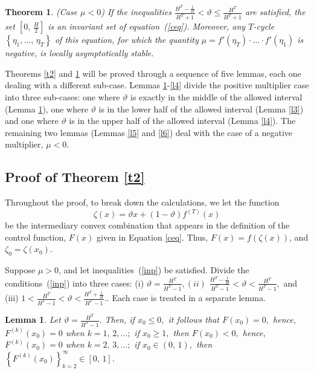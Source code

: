 \documentclass[12pt,a4paper]{amsart}
\newtheorem{theorem}{Theorem}
\newtheorem{lemma}{Lemma}
\begin{document}
\begin{theorem}\label{t3} ({\it Case $\mu < 0$})
If the inequalities $\frac{H^T-\frac{1}{H}}{H^T+1}<\vartheta\leq\frac{H^T}{H^T+1}$ are satisfied, the set $\left[0,\,\frac{H}{2}\right]$ is an invariant set
of equation~(\ref{ceq}). Moreover, any $T$-cycle $\left\{\eta_1,\ldots,\,\eta_T\right\}$ of this equation, for which the quantity 
$\mu = f'(\eta_T)\cdot\ldots\cdot f'(\eta_1)$ is negative, is locally asymptotically stable.
\end{theorem}
Theorems \ref{t2} and \ref{t3} will be proved through a sequence of five lemmas, each one dealing with a different sub-case.  Lemmas \ref{l2}-\ref{l4} divide the positive multiplier case into three sub-cases: one where $\vartheta$ is exactly in the middle of the allowed interval (Lemma \ref{l2}), one where $\vartheta$ is in the lower half of the allowed interval (Lemma \ref{l3}) and one where $\vartheta$ is in the upper half of the allowed interval (Lemma \ref{l4}).  The remaining two lemmas (Lemmas \ref{l5} and \ref{l6}) deal with the case of a negative multiplier, $\mu < 0$.


\subsection{Proof of Theorem \ref{t2}}
Throughout the proof, to break down the calculations, we let the function
$$ \zeta(x) = \vartheta x + (1 - \vartheta)f^{(T)} (x) $$
be the intermediary convex combination that appears in the definition of the control function, $F(x)$ given in Equation \eqref{ceq}. Thus, $F(x) = f(\zeta(x))$, and $\zeta_0 = \zeta(x_0)$.

Suppose $\mu > 0$, and let inequalities~(\ref{inp}) be satisfied. Divide the conditions~(\ref{inp}) into three cases: (i) $\vartheta=\frac{H^T}{H^T-1},(ii) $
$\frac{H^T-\frac{1}{H}}{H^T-1}<\vartheta<\frac{H^T}{H^T-1},$ and (iii) $1<\frac{H^T}{H^T-1}<\vartheta<\frac{H^T+\frac{1}{H}}{H^T-1}.$. Each case is treated in a separate lemma.

\begin{lemma}\label{l2}
Let $\vartheta=\frac{H^T}{H^T-1}.$ Then, if $x_0\leq 0,$ it follows that $F(x_0)=0,$ hence, $F^{(k)}(x_0)=0$ when $k=1,\,2,\ldots;$
if $x_0\geq 1,$ then $F(x_0)<0,$ hence, $F^{(k)}(x_0)=0$ when $k=2,\,3,\ldots;$ if $x_0\in(0,\,1),$ then 
$\left\{F^{(k)}(x_0)\right\}_{k=2}^{\infty}\in[0,\,1].$  
\end{lemma}
\end{document}
